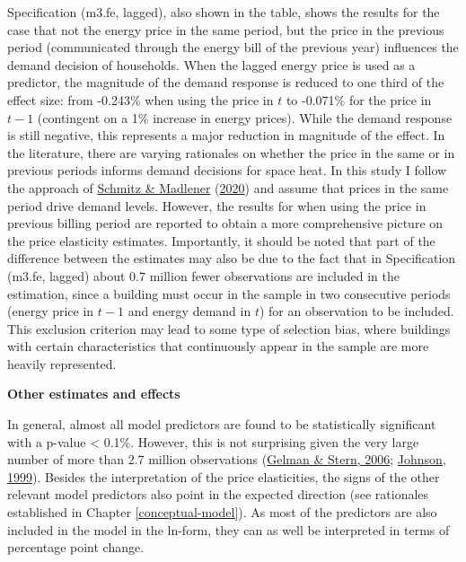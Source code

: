 \documentclass[12pt,twoside]{reedthesis}
\begin{document}
Specification (m3.fe, lagged), also shown in the table, shows the results for the case that not the energy price in the same period, but the price in the previous period (communicated through the energy bill of the previous year) influences the demand decision of households. When the lagged energy price is used as a predictor, the magnitude of the demand response is reduced to one third of the effect size: from -0.243\% when using the price in \(t\) to -0.071\% for the price in \(t-1\) (contingent on a 1\% increase in energy prices). While the demand response is still negative, this represents a major reduction in magnitude of the effect. In the literature, there are varying rationales on whether the price in the same or in previous periods informs demand decisions for space heat. In this study I follow the approach of \protect\hyperlink{ref-schmitz_madlener20}{Schmitz \& Madlener} (\protect\hyperlink{ref-schmitz_madlener20}{2020}) and assume that prices in the same period drive demand levels. However, the results for when using the price in previous billing period are reported to obtain a more comprehensive picture on the price elasticity estimates. Importantly, it should be noted that part of the difference between the estimates may also be due to the fact that in Specification (m3.fe, lagged) about 0.7 million fewer observations are included in the estimation, since a building must occur in the sample in two consecutive periods (energy price in \(t-1\) and energy demand in \(t\)) for an observation to be included. This exclusion criterion may lead to some type of selection bias, where buildings with certain characteristics that continuously appear in the sample are more heavily represented.

\textbf{Other estimates and effects}

In general, almost all model predictors are found to be statistically significant with a p-value \textless{} 0.1\%. However, this is not surprising given the very large number of more than 2.7 million observations (\protect\hyperlink{ref-gelman_stern06}{Gelman \& Stern, 2006}; \protect\hyperlink{ref-johnson99}{Johnson, 1999}). Besides the interpretation of the price elasticities, the signs of the other relevant model predictors also point in the expected direction (see rationales established in Chapter \ref{conceptual-model}). As most of the predictors are also included in the model in the ln-form, they can as well be interpreted in terms of percentage point change.
\end{document}

